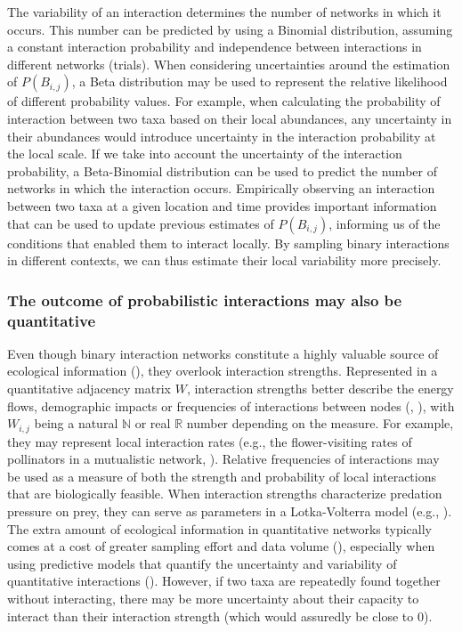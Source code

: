 The variability of an interaction determines the number of networks in which it
occurs. This number can be predicted by using a Binomial distribution, assuming
a constant interaction probability and independence between interactions in
different networks (trials). When considering uncertainties around the
estimation of $P(B_{i, j})$, a Beta distribution may be used to represent the
relative likelihood of different probability values. For example, when
calculating the probability of interaction between two taxa based on their local
abundances, any uncertainty in their abundances would introduce uncertainty in
the interaction probability at the local scale. If we take into account the
uncertainty of the interaction probability, a Beta-Binomial distribution can be
used to predict the number of networks in which the interaction occurs.
Empirically observing an interaction between two taxa at a given location and
time provides important information that can be used to update previous
estimates of $P(B_{i, j})$, informing us of the conditions that enabled them to
interact locally. By sampling binary interactions in different contexts, we can
thus estimate their local variability more precisely. 

\subsubsection{The outcome of probabilistic interactions may also be quantitative}

Even though binary interaction networks constitute a highly valuable source of
ecological information (\cite{Pascual2006Ecological}), they overlook interaction
strengths. Represented in a quantitative adjacency matrix $W$, interaction
strengths better describe the energy flows, demographic impacts or frequencies
of interactions between nodes (\cite{Berlow2004Interaction},
\cite{Borrett2019Walk}), with $W_{i, j}$ being a natural $\mathbb{N}$ or real
$\mathbb{R}$ number depending on the measure. For example, they may represent
local interaction rates (e.g., the flower-visiting rates of pollinators in a
mutualistic network, \cite{Herrera1989Pollinator}). Relative frequencies of
interactions may be used as a measure of both the strength and probability of
local interactions that are biologically feasible. When interaction strengths
characterize predation pressure on prey, they can serve as parameters in a
Lotka-Volterra model (e.g., \cite{Emmerson2004Predatorprey}). The extra amount
of ecological information in quantitative networks typically comes at a cost of
greater sampling effort and data volume (\cite{Strydom2021Roadmapa}), especially
when using predictive models that quantify the uncertainty and variability of
quantitative interactions (\cite{Berlow2004Interaction}). However, if two taxa
are repeatedly found together without interacting, there may be more uncertainty
about their capacity to interact than their interaction strength (which would
assuredly be close to $0$).

